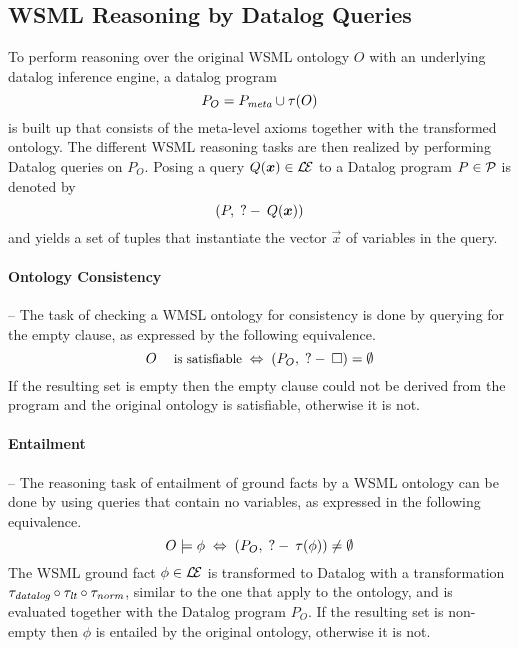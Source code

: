 \subsection{WSML Reasoning by Datalog Queries}

To perform reasoning over the original WSML ontology $O$ with an
underlying datalog inference engine, a datalog program
\begin{displaymath}
    P_O = \mlaxioms \cup \tau(O)
\end{displaymath}
is built up that consists of the meta-level axioms together with
the transformed ontology. The different WSML reasoning tasks are
then realized by performing Datalog queries on $P_O$. Posing a
query $Q(\vec{x}) \in \LE$ to a Datalog program $P \in \P$ is
denoted by
$$(P,\qury Q(\vec{x}))$$ and yields a set of tuples that instantiate
the vector $\vec{x}$ of variables in the query.

\paragraph{Ontology Consistency} -- The task of checking a WMSL
ontology for consistency is done by querying for the empty clause,
as expressed by the following equivalence.
\begin{displaymath}
    O \; \textrm{\footnotesize{is satisfiable}} \; \Leftrightarrow \; (P_O , \qury \square) =
    \emptyset
\end{displaymath}
If the resulting set is empty then the empty clause could not be
derived from the program and the original ontology is satisfiable,
otherwise it is not.

\paragraph{Entailment} -- The reasoning task of entailment of
ground facts by a WSML ontology can be done by using queries that
contain no variables, as expressed in the following equivalence.
\begin{displaymath}
    O \models \phi \; \Leftrightarrow \; (P_O, \qury
    \tau(\phi)) \not= \emptyset
\end{displaymath}
The WSML ground fact $\phi \in \LE$ is transformed to Datalog with
a transformation $\transdlog \circ \translt \circ \transnorm$,
similar to the one that apply to the ontology, and is evaluated
together with the Datalog program $P_O$. If the resulting set is
non-empty then $\phi$ is entailed by the original ontology,
otherwise it is not.

